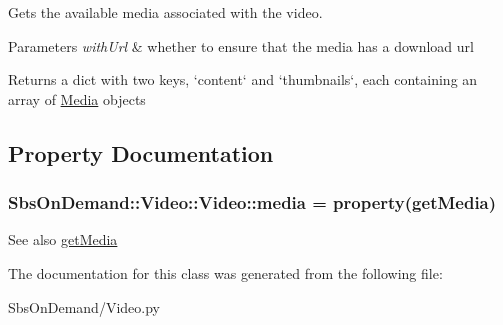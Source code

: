 \-Gets the available media associated with the video. 


\begin{DoxyParams}{\-Parameters}
{\em with\-Url} & whether to ensure that the media has a download url \\
\hline
\end{DoxyParams}
\begin{DoxyReturn}{\-Returns}
a dict with two keys, `content` and `thumbnails`, each containing an array of \hyperlink{namespace_sbs_on_demand_1_1_media}{\-Media} objects 
\end{DoxyReturn}


\subsection{\-Property \-Documentation}
\hypertarget{class_sbs_on_demand_1_1_video_1_1_video_adc7a5dd47db630b8dd3b80b2b0dddd87}{
\subsubsection[{media}]{\setlength{\rightskip}{0pt plus 5cm}\-Sbs\-On\-Demand\-::\-Video\-::\-Video\-::media = property(get\-Media)}}
\label{class_sbs_on_demand_1_1_video_1_1_video_adc7a5dd47db630b8dd3b80b2b0dddd87}
\begin{DoxySeeAlso}{\-See also}
\hyperlink{class_sbs_on_demand_1_1_video_1_1_video_a09aeecba9b9c1bd4b33b0f0c8d20a4ed}{get\-Media} 
\end{DoxySeeAlso}


\-The documentation for this class was generated from the following file\-:\begin{DoxyCompactItemize}
\item 
\-Sbs\-On\-Demand/\-Video.\-py\end{DoxyCompactItemize}
